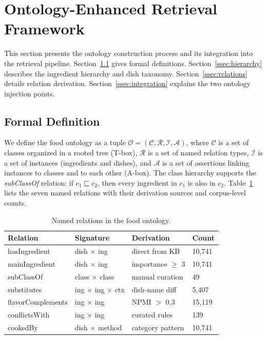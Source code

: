 \section{Ontology-Enhanced Retrieval Framework}
\label{sec:framework}

This section presents the ontology construction process and its integration into the retrieval pipeline. Section~\ref{ssec:formal} gives formal definitions. Section~\ref{ssec:hierarchy} describes the ingredient hierarchy and dish taxonomy. Section~\ref{ssec:relations} details relation derivation. Section~\ref{ssec:integration} explains the two ontology injection points.

\subsection{Formal Definition}
\label{ssec:formal}

We define the food ontology as a tuple $\mathcal{O} = (\mathcal{C}, \mathcal{R}, \mathcal{I}, \mathcal{A})$, where $\mathcal{C}$ is a set of classes organized in a rooted tree (T-box), $\mathcal{R}$ is a set of named relation types, $\mathcal{I}$ is a set of instances (ingredients and dishes), and $\mathcal{A}$ is a set of assertions linking instances to classes and to each other (A-box). The class hierarchy supports the \emph{subClassOf} relation: if $c_1 \sqsubseteq c_2$, then every ingredient in $c_1$ is also in $c_2$. Table~\ref{tab:relations} lists the seven named relations with their derivation sources and corpus-level counts.

\begin{table}[t]
\centering
\caption{Named relations in the food ontology.}
\label{tab:relations}
\small
\begin{tabular}{llll}
\toprule
\textbf{Relation} & \textbf{Signature} & \textbf{Derivation} & \textbf{Count} \\
\midrule
hasIngredient      & dish $\times$ ing            & direct from KB     & 10{,}741 \\
mainIngredient     & dish $\times$ ing            & importance $\geq$ 3 & 10{,}741 \\
subClassOf         & class $\times$ class         & manual curation    & 49 \\
substitutes        & ing $\times$ ing $\times$ ctx & dish-name diff    & 5{,}407 \\
flavorComplements  & ing $\times$ ing             & NPMI $>$ 0.3      & 15{,}119 \\
conflictsWith      & ing $\times$ ing             & curated rules      & 139 \\
cookedBy           & dish $\times$ method         & category pattern   & 10{,}741 \\
\bottomrule
\end{tabular}
\end{table}


